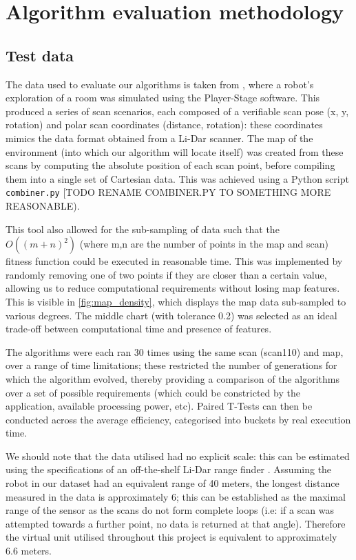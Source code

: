 \documentclass[authoryearcitations]{UoYCSproject}
\begin{document}
\clearpage

\chapter{Algorithm evaluation methodology}
\label{cha:system_design}

\section{Test data}
The data used to evaluate our algorithms is taken from \citet{Lenac2011-co}, where a robot's exploration of a room was simulated using the Player-Stage software. This produced a series of scan scenarios, each composed of a verifiable scan pose (x, y, rotation) and polar scan coordinates (distance, rotation): these coordinates mimics the data format obtained from a Li-Dar scanner. The map of the environment (into which our algorithm will locate itself) was created from these scans by computing the absolute position of each scan point, before compiling them into a single set of Cartesian data. This was achieved using a Python script \lstinline{combiner.py} [TODO RENAME COMBINER.PY TO SOMETHING MORE REASONABLE).

This tool also allowed for the sub-sampling of data such that the $O((m+n)^2)$  (where m,n are the number of points in the map and scan) fitness function could be executed in reasonable time. This was implemented by randomly removing one of two points if they are closer than a certain value, allowing us to reduce computational requirements without losing map features. This is visible in \autoref{fig:map_density}, which displays the map data sub-sampled to various degrees. The middle chart (with tolerance 0.2) was selected as an ideal trade-off between computational time and presence of features.

The algorithms were each ran 30 times using the same scan (scan110) and map, over a range of time limitations; these restricted the number of generations for which the algorithm evolved, thereby providing a comparison of the algorithms over a set of possible requirements (which could be constricted by the application, available processing power, etc). Paired T-Tests can then be conducted across the average efficiency, categorised into buckets by real execution time.

We should note that the data utilised had no explicit scale: this can be estimated using the specifications of an off-the-shelf Li-Dar range finder \cite{noauthor_undated-bu}. Assuming the robot in our dataset had an equivalent range of 40 meters, the longest distance measured in the data is approximately 6; this can be established as the maximal range of the sensor as the scans do not form complete loops (i.e: if a scan was attempted towards a further point, no data is returned at that angle). Therefore the virtual unit utilised throughout this project is equivalent to approximately 6.6 meters.
\end{document}

